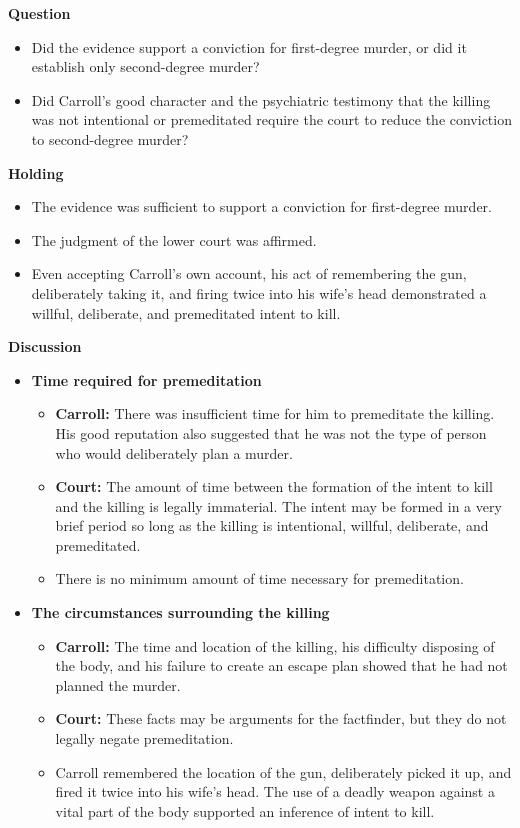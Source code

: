 \documentclass[11pt]{tex/lawoutline}
\begin{document}
{        \textbf{Question}
        \begin{itemize}
            \item Did the evidence support a conviction for first-degree murder, or did it establish only second-degree murder?
            \item Did Carroll's good character and the psychiatric testimony that the killing was not intentional or premeditated require the court to reduce the conviction to second-degree murder?
        \end{itemize}

        \textbf{Holding}
        \begin{itemize}
            \item The evidence was sufficient to support a conviction for first-degree murder.
            \item The judgment of the lower court was affirmed.
            \item Even accepting Carroll's own account, his act of remembering the gun, deliberately taking it, and firing twice into his wife's head demonstrated a willful, deliberate, and premeditated intent to kill.
        \end{itemize}

        \textbf{Discussion}
        \begin{itemize}
            \item \textbf{Time required for premeditation}
            \begin{itemize}
                \item \textbf{Carroll:} There was insufficient time for him to premeditate the killing. His good reputation also suggested that he was not the type of person who would deliberately plan a murder.
                \item \textbf{Court:} The amount of time between the formation of the intent to kill and the killing is legally immaterial. The intent may be formed in a very brief period so long as the killing is intentional, willful, deliberate, and premeditated.
                \item There is no minimum amount of time necessary for premeditation.
            \end{itemize}

            \item \textbf{The circumstances surrounding the killing}
            \begin{itemize}
                \item \textbf{Carroll:} The time and location of the killing, his difficulty disposing of the body, and his failure to create an escape plan showed that he had not planned the murder.
                \item \textbf{Court:} These facts may be arguments for the factfinder, but they do not legally negate premeditation.
                \item Carroll remembered the location of the gun, deliberately picked it up, and fired it twice into his wife's head. The use of a deadly weapon against a vital part of the body supported an inference of intent to kill.
            \end{itemize}


\end{itemize}}
\end{document}
